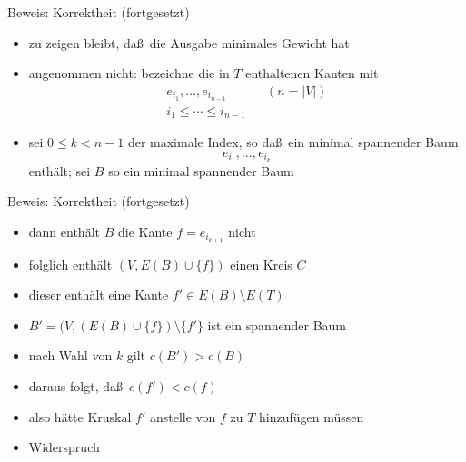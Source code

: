 \documentclass[aspectratio=1610, 11pt]{beamer}
\begin{document}
\begin{frame}
\begin{overprint}
\begin{exampleblock}{Beweis: Korrektheit (fortgesetzt)}
\begin{itemize}
				\item zu zeigen bleibt, da\ss\ die Ausgabe minimales Gewicht hat
				\item angenommen nicht: bezeichne die in $T$ enthaltenen Kanten mit
					\begin{align*}
						e_{i_1},\ldots,e_{i_{n-1}}&&(n=|V|)\\
						i_1\leq\cdots\leq i_{n-1}
					\end{align*}
				\item sei $0\leq k<n-1$ der maximale Index, so da\ss\ ein minimal spannender Baum $$e_{i_1},\ldots,e_{i_k}$$ enth\"alt; sei $B$ so ein minimal spannender Baum
			\end{itemize}
		\end{exampleblock}
		\begin{exampleblock}{Beweis: Korrektheit (fortgesetzt)}
			\begin{itemize}
				\item dann enth\"alt $B$ die Kante $f=e_{i_{k+1}}$ nicht
				\item folglich enth\"alt $(V,E(B)\cup\{f\})$ einen Kreis $C$
				\item dieser enth\"alt eine Kante $f'\in E(B)\setminus E(T)$
				\item $B'=(V,(E(B)\cup\{f\})\setminus\{f'\}$ ist ein spannender Baum
				\item nach Wahl von $k$ gilt $c(B')>c(B)$
				\item daraus folgt, da\ss\ $c(f')<c(f)$
				\item also h\"atte Kruskal $f'$ anstelle von $f$ zu $T$ hinzuf\"ugen m\"ussen
				\item Widerspruch
			\end{itemize}
		\end{exampleblock}
	\end{overprint}
\end{frame}
\end{document}

